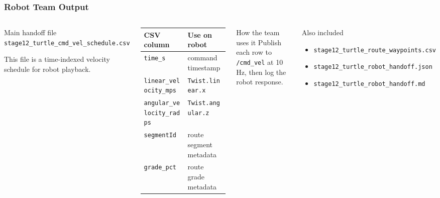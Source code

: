 \documentclass[aspectratio=169]{beamer}
\begin{document}
\begin{frame}
\frametitle{Robot Team Output}

\begin{columns}[T,totalwidth=\textwidth]
\begin{block}{Main handoff file}
\small
\texttt{stage12\_turtle\_cmd\_vel\_schedule.csv}

\vspace{0.25cm}
This file is a time-indexed velocity schedule for robot playback.
\end{block}

\vspace{0.25cm}
\scriptsize
\begin{tabular}{ll}
\toprule
CSV column & Use on robot \\
\midrule
\texttt{time\_s} & command timestamp \\
\texttt{linear\_velocity\_mps} & \texttt{Twist.linear.x} \\
\texttt{angular\_velocity\_radps} & \texttt{Twist.angular.z} \\
\texttt{segmentId} & route segment metadata \\
\texttt{grade\_pct} & route grade metadata \\
\bottomrule
\end{tabular}

\begin{alertblock}{How the team uses it}
\small
Publish each row to \texttt{/cmd\_vel} at 10 Hz, then log the robot response.
\end{alertblock}

\vspace{0.25cm}
\begin{block}{Also included}
\tiny
\begin{itemize}
    \item \texttt{stage12\_turtle\_route\_waypoints.csv}
    \item \texttt{stage12\_turtle\_robot\_handoff.json}
    \item \texttt{stage12\_turtle\_robot\_handoff.md}
\end{itemize}
\end{block}
\end{columns}

\end{frame}
\end{document}
